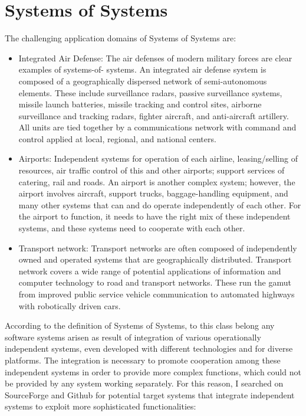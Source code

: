 \chapter{Systems of Systems}\label{ch:SoS}
The challenging application domains of Systems of Systems are:
\begin{itemize}
  \item Integrated Air Defense: The air defenses of modern military forces are
  clear examples of systems-of- systems. An integrated air defense system is composed of a geographically dispersed network of semi-autonomous elements. These include surveillance radars, passive surveillance systems, missile launch batteries, missile tracking and control sites, airborne surveillance and tracking radars, fighter aircraft, and anti-aircraft artillery. All units are tied together by a communications network with command and control applied at local, regional, and national centers.
  
  \item Airports: Independent systems for operation of each airline,
  leasing/selling of resources, air traffic control of this and other airports; support services of catering, rail and roads. An airport is another complex system; however, the airport involves aircraft, support trucks, baggage-handling equipment, and many other systems that can and do operate independently of each other. For the airport to function, it needs to have the right mix of these independent systems, and these systems need to cooperate with each other.
  
  \item Transport network: Transport networks are often composed of independently
  owned and operated systems that are geographically distributed.  Transport network covers a wide range of potential applications of information and computer technology to road and transport networks. These run the gamut from improved public service vehicle communication to automated highways with robotically driven cars.
\end{itemize}

According to the definition of Systems of Systems, to this class belong
any software systems arisen as result of integration of various operationally
independent systems, even developed with different technologies and for diverse
platforms. The integration is necessary to promote cooperation among these
independent systems in order to provide more complex functions, which could not
be provided by any system working separately.
For this reason, I searched on SourceForge and Github for potential target
systems that integrate independent systems to exploit more sophisticated
functionalities:


